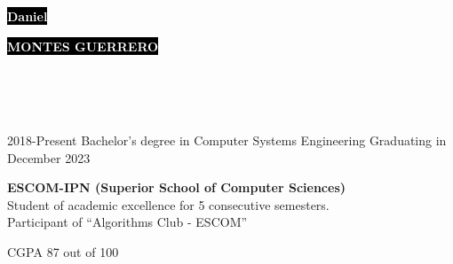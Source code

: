 \documentclass[9pt]{developercv} %
\begin{document}

\begin{minipage}[t]{0.70\textwidth} %
	\vspace{-\baselineskip} %
	
	\colorbox{black}{{\HUGE\textcolor{white}{\textbf{{Daniel}}}}} %
	
	\colorbox{black}{{\HUGE\textcolor{white}{\textbf{{MONTES GUERRERO}}}}} %
	
	\vspace{6pt}
\end{minipage}
\begin{minipage}[t]{0.3\textwidth} %
	\vspace{-\baselineskip} %
	
	\\
	\\
	\\
\end{minipage}



\begin{entrylist}
	\entry
		{2018-Present}
		{Bachelor’s degree in Computer Systems Engineering}
		{Graduating in December 2023}
		{\textbf{ESCOM-IPN (Superior School of Computer Sciences)}\\
		Student of academic excellence for 5 consecutive semesters.\\
		Participant of ``Algorithms Club - ESCOM''
		 \begin{flushright}
		 	CGPA 87 out of 100
		 \end{flushright}
		}
\end{entrylist}
\end{document}
